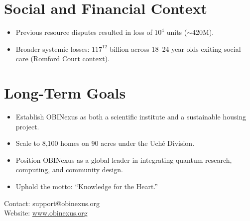 \documentclass[12pt]{article}
\begin{document}
\section*{Social and Financial Context}
\begin{itemize}[leftmargin=*]
    \item Previous resource disputes resulted in loss of \(10^4\) units ($\sim$420M).
    \item Broader systemic losses: $117^{12}$ billion across 18--24 year olds exiting social care (Romford Court context).
\end{itemize}

\section*{Long-Term Goals}
\begin{itemize}[leftmargin=*]
    \item Establish OBINexus as both a scientific institute and a sustainable housing project.
    \item Scale to 8,100 homes on 90 acres under the Uch\'e Division.
    \item Position OBINexus as a global leader in integrating quantum research, computing, and community design.
    \item Uphold the motto: ``Knowledge for the Heart.''
\end{itemize}

\vfill
\begin{center}
    Contact: support@obinexus.org \\
    Website: \href{http://obinexus.org}{www.obinexus.org}
\end{center}
\end{document}
